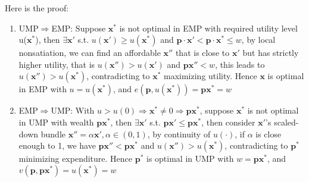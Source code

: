 Here is the proof:
\begin{enumerate}
    \item UMP$\Rightarrow$EMP: Suppose $\mathbf{x}^*$ is not optimal in EMP with required utility level u($\mathbf{x}^*$), then $\exists \mathbf{x}'$ s.t. $u(\mathbf{x}')\geq u(\mathbf{x}^*)$ and $\mathbf{p}\cdot\mathbf{x}'<\mathbf{p}\cdot\mathbf{x}^*\leq w$, by local nonsatiation, we can find an affordable $\mathbf{x}''$ that is close to $\mathbf{x}'$ but has strictly higher utility, that is $u(\mathbf{x}'')>u(\mathbf{x}')$ and $\mathbf{p}\mathbf{x}''< w$, this leads to $u(\mathbf{x}'')>u(\mathbf{x}^*)$, contradicting to $\mathbf{x}^*$ maximizing utility. Hence $\mathbf{x}$ is optimal in EMP with $u=u(\mathbf{x}^*)$, and $e(\mathbf{p},u(\mathbf{x}^*))=\mathbf{p}\mathbf{x}^*=w$
    \item EMP$\Rightarrow$UMP: With $u>u(0)\Rightarrow \mathbf{x}^*\neq 0\Rightarrow \mathbf{p}\mathbf{x}^*$, suppose $\mathbf{x}^*$ is not optimal in UMP with wealth $\mathbf{p}\mathbf{x}^*$, then $\exists \mathbf{x}'$ s.t. $\mathbf{p}\mathbf{x}'\leq \mathbf{p}\mathbf{x}^*$, then consider $\mathbf{x}'$'s scaled-down bundle $\mathbf{x}''=\alpha \mathbf{x}',\alpha\in(0,1)$, by continuity of $u(\cdot)$, if $\alpha$ is close enough to 1, we have $\mathbf{p}\mathbf{x}''<\mathbf{p}\mathbf{x}^*$ and $u(\mathbf{x}'')>u(\mathbf{x}^*)$, contradicting to $\mathbf{p}^*$ minimizing expenditure. Hence $\mathbf{p}^*$ is optimal in UMP with $w=\mathbf{p}\mathbf{x}^*$, and $v(\mathbf{p},\mathbf{p}\mathbf{x}^*)=u(\mathbf{x}^*)=w$
\end{enumerate}